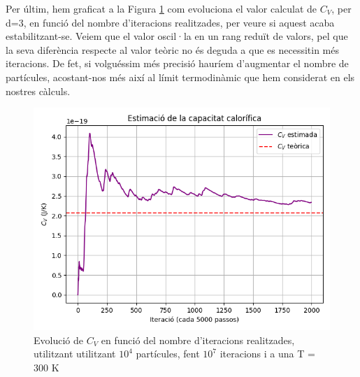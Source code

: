 \documentclass{article}
\begin{document}
	Per últim, hem graficat a la Figura \ref{figura_evolucio_C_V}  com evoluciona el valor calculat de $C_V$, per d=3, en funció del nombre d'iteracions realitzades, per veure si aquest acaba estabilitzant-se. Veiem que el valor oscil·la en un rang reduït de valors, pel que la seva diferència respecte al valor teòric no és deguda a que es necessitin més iteracions. De fet, si volguéssim més precisió hauríem d'augmentar el nombre de partícules, acostant-nos més així al límit termodinàmic que hem considerat en els nostres càlculs. 
	
\begin{figure}
	\centering
	\includegraphics[width=0.7\linewidth]{MonteCarlo.png}
	\caption{Evolució de $C_V$ en funció del nombre d'iteracions realitzades, utilitzant utilitzant $10^4$ partícules, fent $10^7$ iteracions i a una T = 300 K}
	\label{figura_evolucio_C_V}
\end{figure}
	
	
\end{document}
